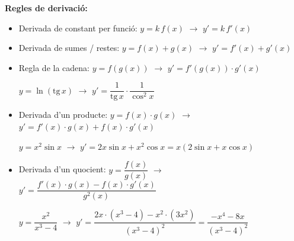 \begin{center}
\textbf{Regles de derivació:}
\end{center}

\begin{itemize}

	\item Derivada de constant per funció:
	$y=k \, f(x)$   $\rightarrow$   $y'=k \, f'(x)$
	
	
	
	\item Derivada de sumes / restes:
	$y=f(x)+g(x)$   $\rightarrow$   $y'=f'(x)+g'(x)$
	
	
	
	\item Regla de la cadena:
	$y=f(g(x))$   $\rightarrow$   $y'=f'(g(x))\cdot g'(x)$
	\begin{center}
	$y=\ln (\mathrm{tg}\, x)$   $\rightarrow$   $y'=\dfrac{1}{\mathrm{tg}\, x} \cdot \dfrac{1}{\cos^2 x}$
	\end{center}
	
	\item Derivada d'un producte:
	$y=f(x)\cdot g(x)$   $\rightarrow$   $y'=f'(x)\cdot g(x)+f(x)\cdot g'(x)$
	\begin{center}
	$y=x^2 \sin x$   $\rightarrow$   $y'=2x\sin x + x^2 \cos x = x (2 \sin x + x \cos x)$
	\end{center}
	\item Derivada d'un quocient:
	$y=\dfrac{f(x)}{g(x)}$   $\rightarrow$   $y'=\dfrac{f'(x)\cdot g(x)-f(x)\cdot g'(x)}{g^2(x)}$
	\begin{center}
	$y=\dfrac{x^2}{x^3-4}$   $\rightarrow$   $y'=\dfrac{2x \cdot (x^3-4)-x^2 \cdot (3x^2)}{(x^3-4)^2}=\dfrac{-x^4-8x}{(x^3-4)^2}$
	\end{center}
	
\end{itemize}




